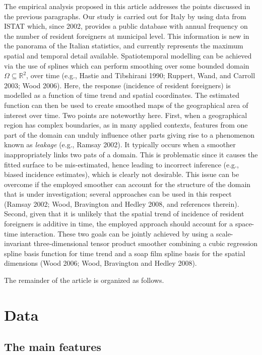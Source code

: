 \documentclass[10pt] {article}
\theoremstyle{definition}
\theoremstyle{plain}
\begin{document}
The empirical analysis proposed in this article addresses the points discussed in the previous paragraphs. Our study is carried out for Italy by using data from ISTAT which, since 2002, provides a public database with annual frequency on the number of resident foreigners at municipal level. This information is new in the panorama of the Italian statistics, and currently represents the maximum spatial and temporal detail available. Spatiotemporal modelling can be achieved via the use of splines which can perform smoothing over some bounded domain $\Omega\subseteq\mathbb{R}^2$, over time (e.g., Hastie and Tibshirani 1990; Ruppert, Wand, and Carroll 2003; Wood 2006). Here, the response (incidence of resident foreigners) is modelled as a function of time trend and spatial coordinates. The estimated function can then be used to create smoothed maps of the geographical area of interest over time. Two points are noteworthy here. First, when a geographical region has complex boundaries, as in many applied contexts, features from one part of the domain can unduly influence other parts giving rise to a phenomenon known as \textit{leakage} (e.g., Ramsay 2002). It typically occurs when a smoother inappropriately links two pats of a domain. This is problematic since it causes the fitted surface to be mis-estimated, hence leading to incorrect inference (e.g., biased incidence estimates), which is clearly not desirable. This issue can be overcome if the employed smoother can account for the structure of the domain that is under investigation; several approaches can be used in this respect (Ramsay 2002; Wood, Bravington and Hedley 2008, and references therein). Second, given that it is unlikely that the spatial trend of incidence of resident foreigners is additive in time, the employed approach should account for a space-time interaction. These two goals can be jointly achieved by using a scale-invariant three-dimensional tensor product smoother combining a cubic regression spline basis function for time trend and a soap film spline basis for the spatial dimensions (Wood 2006; Wood, Bravington and Hedley 2008).

The remainder of the article is organized as follows.


\section{Data \label{DAT}}

\subsection{The main features \label{SDC}}
\end{document}
